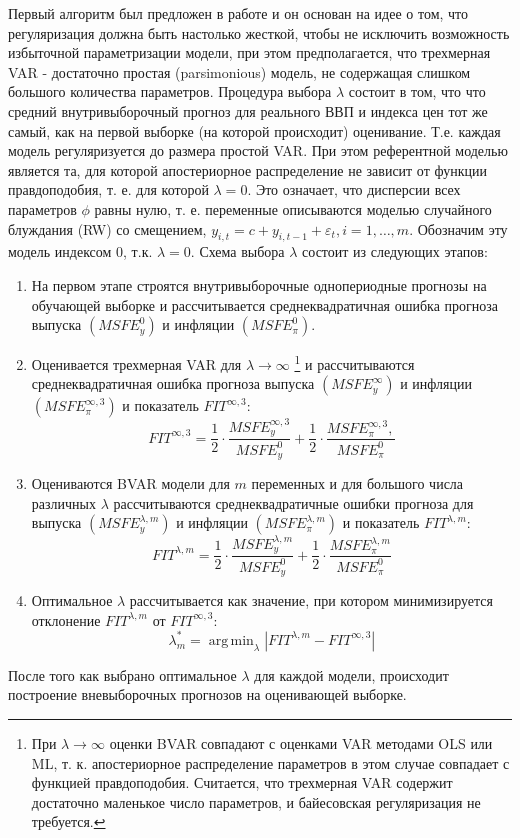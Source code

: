 \documentclass[11pt]{article} %
\DeclareMathOperator*{\argmin}{arg\,min}
\begin{document}
Первый алгоритм был предложен в работе \cite{banbura_al_2010} и он основан на идее о том, что регуляризация должна быть настолько жесткой, чтобы не исключить возможность избыточной параметризации модели, при этом предполагается, что трехмерная VAR - достаточно простая (parsimonious) модель, не содержащая слишком большого количества параметров. Процедура выбора $\lambda$ состоит в том, что что средний внутривыборочный прогноз для реального ВВП и индекса цен тот же самый, как на первой выборке (на которой происходит) оценивание. Т.е. каждая модель регуляризуется до размера простой VAR. При этом  референтной моделью является та, для которой апостериорное распределение не зависит от функции правдоподобия, т. е. для которой $\lambda=0$. Это означает, что дисперсии всех параметров $\phi$ равны нулю, т. е. переменные описываются моделью случайного блуждания (RW) со смещением, $y_{i,t}=c+y_{i,t-1} +\varepsilon_t, i=1,\ldots,m$. Обозначим эту модель индексом 0,  т.к. $\lambda=0$.
Схема выбора $\lambda$ состоит из следующих этапов:
\begin{enumerate}
\item На первом этапе  строятся внутривыборочные однопериодные прогнозы на обучающей выборке и рассчитывается среднеквадратичная ошибка прогноза выпуска $(MSFE_y^{0})$ и инфляции $(MSFE_{\pi}^{0})$.
\item Оценивается трехмерная VAR для $\lambda\to \infty$ \footnote{При $\lambda\to \infty$ оценки BVAR совпадают с оценками VAR методами OLS или ML, т. к. апостериорное распределение параметров в этом случае совпадает с функцией правдоподобия. Считается, что трехмерная VAR содержит достаточно маленькое число параметров, и байесовская регуляризация не требуется.} и рассчитываются среднеквадратичная ошибка прогноза выпуска $(MSFE_y^{\infty})$ и инфляции $(MSFE_{\pi}^{\infty,3})$ и показатель $FIT^{\infty,3}$:
\begin{equation}
FIT^{\infty,3}=\frac{1}{2}\cdot\frac{MSFE_y^{\infty,3}}{MSFE^0_y} + \frac{1}{2}\cdot\frac{MSFE_{\pi}^{\infty,3},}{MSFE^0_{\pi}}
\end{equation}
\item Оцениваются BVAR модели для $m$ переменных и для большого числа различных $\lambda$ рассчитываются среднеквадратичные ошибки прогноза для выпуска $(MSFE_y^{\lambda,m})$ и инфляции $(MSFE_{\pi}^{\lambda,m})$ и показатель $FIT^{{\lambda,m}}$: 
\begin{equation}
FIT^{\lambda,m}=\frac{1}{2}\cdot\frac{MSFE_y^{\lambda,m}}{MSFE^0_y} + \frac{1}{2}\cdot\frac{MSFE_{\pi}^{\lambda,m}}{MSFE^0_{\pi}}
\end{equation}
\item Оптимальное $\lambda$ рассчитывается как значение, при котором минимизируется отклонение $FIT^{\lambda,m}$ от $FIT^{\infty,3}$:
\begin{equation}
\lambda^*_m=\argmin_{\lambda} |FIT^{\lambda, m}-FIT^{\infty,3}| 
\end{equation}
\end{enumerate}
После того как выбрано оптимальное $\lambda$ для каждой модели, происходит построение вневыборочных прогнозов на оценивающей выборке.
\end{document}
